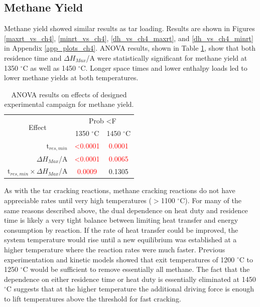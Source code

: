 \documentclass[11pt,twocolumn]{article}
\begin{document}

\subsection*{Methane Yield}

Methane yield showed similar results as tar loading.  Results are shown in Figures \ref{maxrt_vs_ch4}, \ref{minrt_vs_ch4}, \ref{dh_vs_ch4_maxrt}, and \ref{dh_vs_ch4_minrt} in Appendix \ref{app_plots_ch4}.  ANOVA results, shown in Table \ref{anova_ch4}, show that both residence time and $\Delta H_{Max}$/A were statistically significant for methane yield at 1350  $^\circ$C as well as 1450  $^\circ$C.  Longer space times and lower enthalpy loads led to lower methane yields at both temperatures.

\begin{table}
	\centering
	\caption{ANOVA results on effects of designed experimental campaign for methane yield.}
	\begin{tabular}{r c c}
		\toprule
		\multicolumn{1}{c}{\multirow{2}{*}{Effect}}		& 	\multicolumn{2}{c}{Prob \textless F	}	\\
		{}								&	1350 $^\circ$C	&	1450 $^\circ$C			\\
		\midrule
		t$_{res,min}$						&	\textcolor{red}{\textless 0.0001}	&	\textcolor{red}{0.0001}	\\
		$\Delta H_{Max}$/A					&	\textcolor{red}{\textless 0.0001}	&	\textcolor{red}{0.0065}	\\
		t$_{res,min}\times \Delta H_{Max}$/A	&	\textcolor{red}{0.0009}			&	0.1305				\\
		\bottomrule
	\end{tabular}
	\label{anova_ch4}
\end{table}
 
As with the tar cracking reactions, methane cracking reactions do not have appreciable rates until very high temperatures ($>$1100 $^{\circ}$C).  For many of the same reasons described above, the dual dependence on heat duty and residence time is likely a very tight balance between limiting heat transfer and energy consumption by reaction.  If the rate of heat transfer could be improved, the system temperature would rise until a new equilibrium was established at a higher temperature where the reaction rates were much faster.  Previous experimentation and kinetic models showed that exit temperatures of 1200 $^{\circ}$C to 1250 $^{\circ}$C would be sufficient to remove essentially all methane.  The fact that the dependence on either residence time or heat duty is essentially eliminated at 1450 $^{\circ}$C suggests that at the higher temperature the additional driving force is enough to lift temperatures above the threshold for fast cracking.
\end{document}
